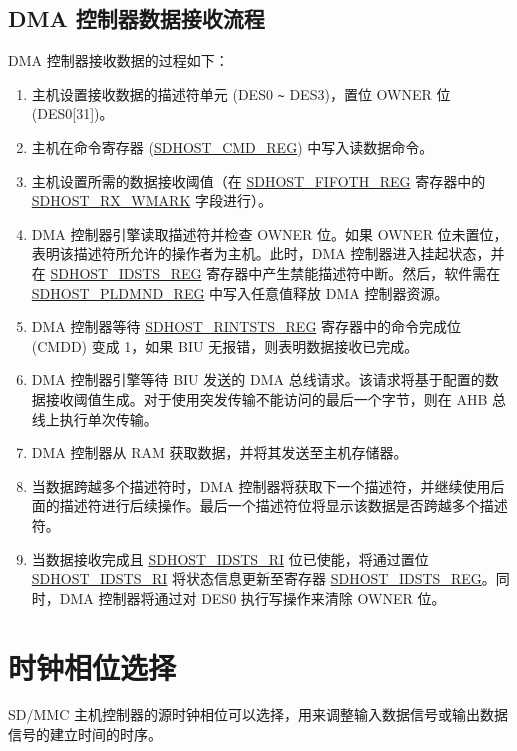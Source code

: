 \documentclass[main\_\_CN.tex]{subfiles}
\begin{document}
\subsection{DMA 控制器数据接收流程}\label{sec:sdhost-dma-rx}

DMA 控制器接收数据的过程如下：

\begin{enumerate}
\item 主机设置接收数据的描述符单元 (DES0 \verb+~+ DES3)，置位 OWNER 位 (DES0[31])。
\item 主机在命令寄存器 (\hyperref[regdesc:SDHOSTCMDREG]{SDHOST\_CMD\_REG}) 中写入读数据命令。
\item 主机设置所需的数据接收阈值（在 \hyperref[regdesc:SDHOSTFIFOTHREG]{SDHOST\_FIFOTH\_REG} 寄存器中的 \hyperref[fielddesc:SDHOSTRXWMARK]{SDHOST\_RX\_WMARK} 字段进行）。
\item DMA 控制器引擎读取描述符并检查 OWNER 位。如果 OWNER 位未置位，表明该描述符所允许的操作者为主机。此时，DMA 控制器进入挂起状态，并在 \hyperref[regdesc:SDHOSTIDSTSREG]{SDHOST\_IDSTS\_REG} 寄存器中产生禁能描述符中断。然后，软件需在 \hyperref[regdesc:SDHOSTPLDMNDREG]{SDHOST\_PLDMND\_REG} 中写入任意值释放 DMA 控制器资源。
\item DMA 控制器等待 \hyperref[regdesc:SDHOSTRINTSTSREG]{SDHOST\_RINTSTS\_REG} 寄存器中的命令完成位 (CMDD) 变成 1，如果 BIU 无报错，则表明数据接收已完成。
\item DMA 控制器引擎等待 BIU 发送的 DMA 总线请求。该请求将基于配置的数据接收阈值生成。对于使用突发传输不能访问的最后一个字节，则在 AHB 总线上执行单次传输。
\item DMA 控制器从 RAM 获取数据，并将其发送至主机存储器。
\item 当数据跨越多个描述符时，DMA 控制器将获取下一个描述符，并继续使用后面的描述符进行后续操作。最后一个描述符位将显示该数据是否跨越多个描述符。
\item 当数据接收完成且 \hyperref[fielddesc:SDHOSTIDSTSRI]{SDHOST\_IDSTS\_RI} 位已使能，将通过置位 \hyperref[fielddesc:SDHOSTIDSTSRI]{SDHOST\_IDSTS\_RI} 将状态信息更新至寄存器 \hyperref[regdesc:SDHOSTIDSTSREG]{SDHOST\_IDSTS\_REG}。同时，DMA 控制器将通过对 DES0 执行写操作来清除 OWNER 位。
\end{enumerate}

\section{时钟相位选择}
\label{sec:sdhost-phase-selection}

SD/MMC 主机控制器的源时钟相位可以选择，用来调整输入数据信号或输出数据信号的建立时间的时序。
\end{document}
